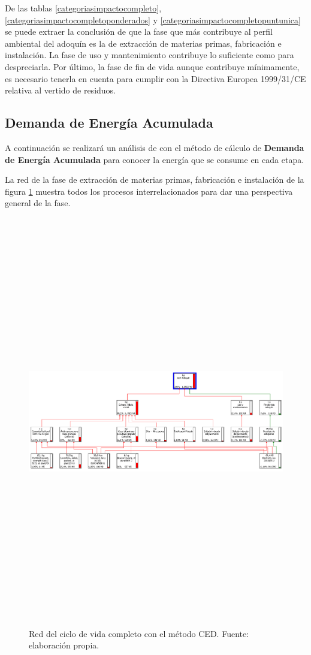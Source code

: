 De las tablas \ref{categoriasimpactocompleto}, \ref{categoriasimpactocompletoponderados} y \ref{categoriasimpactocompletopuntunica} se puede extraer la conclusión de que la fase que más contribuye al perfil ambiental del adoquín es la de extracción de materias primas, fabricación e instalación. La fase de uso y mantenimiento contribuye lo suficiente como para despreciarla. Por último, la fase de fin de vida aunque contribuye mínimamente, es necesario tenerla en cuenta para cumplir con la Directiva Europea 1999/31/CE relativa al vertido de residuos.

\subsection{Demanda de Energía Acumulada}
A continuación se realizará un análisis de con el método de cálculo de \textbf{Demanda de Energía Acumulada} para conocer la energía que se consume en cada etapa.

La red de la fase de extracción de materias primas, fabricación e instalación de la figura \ref{fig:ced_red} muestra todos los procesos interrelacionados para dar una perspectiva general de la fase.

\begin{figure}[!htbp]
\centering
\includegraphics[angle=90,height=18cm]{img/ced_red.png}
\caption[Red del ciclo de vida completo con el método CED.]{Red del ciclo de vida completo con el método CED. Fuente: elaboración propia.}
\label{fig:ced_red}
\end{figure}

